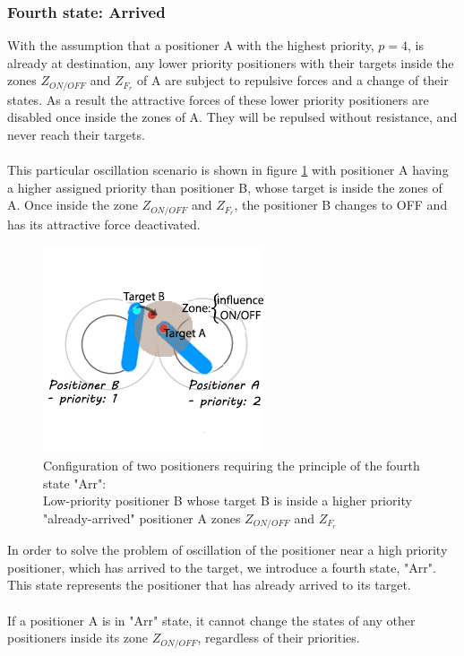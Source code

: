 \documentclass[]{spie}  %
\begin{document}
	\subsubsection{Fourth state: Arrived}
	\label{sub_chap_fourth_state}
	With the assumption that a positioner A with the highest priority, $p = 4$, is already at destination, any lower priority positioners with their targets inside the zones $Z_{ON/OFF}$ and $Z_{F_{r}}$ of A are subject to repulsive forces and a change of their states. As a result the attractive forces of these lower priority positioners are disabled once inside the zones of A. They will be repulsed without resistance, and never reach their targets.\\
	\\
	This particular oscillation scenario is shown in figure \ref{fourth_state} with positioner A having a higher assigned priority than positioner B, whose target is inside the zones of A. Once inside the zone $Z_{ON/OFF}$ and $Z_{F_{r}}$, the positioner B changes to OFF and has its attractive force deactivated.
	\begin{figure}[H]
		\centering
		\includegraphics[scale=0.64]{images/fourth_state.jpg}
		\caption{\centering	Configuration of two positioners requiring the principle of the fourth state "Arr":\\
		Low-priority positioner B whose target B is inside a higher priority "already-arrived" positioner A zones $Z_{ON/OFF}$ and $Z_{F_{r}}$ }
		\label{fourth_state}
	\end{figure}
	In order to solve the problem of oscillation of the positioner near a high priority positioner, which has arrived to the target, we introduce a fourth state, "Arr". This state represents the positioner that has already arrived to its target. \\\\
	If a positioner A is in "Arr" state, it cannot change the states of any other positioners inside its zone $Z_{ON/OFF}$, regardless of their priorities. 
\end{document}

